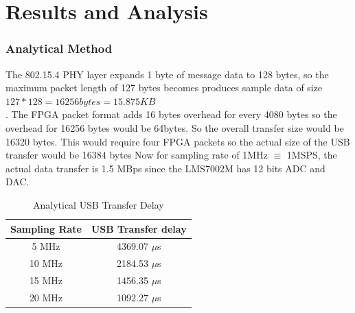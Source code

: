 \documentclass{kththesis}
\begin{document}


\frontmatter



\setcounter{secnumdepth}{2}
\setcounter{tocdepth}{2}
\tableofcontents
\listoffigures
\listoftables

\clearpage

\printacronyms[ heading= chapter*, sort=true]


%
\mainmatter










\chapter{Results and Analysis}
\subsection{Analytical Method}
The 802.15.4 PHY layer expands 1 byte of message data to 128 bytes, so the maximum packet length of 127 bytes becomes produces sample data of size
$127*128=16256 bytes=15.875KB$\\. The FPGA packet format adds 16 bytes overhead for every 4080 bytes so the overhead for 16256 bytes would be 64bytes. So the overall transfer size would be 16320 bytes. This would require four FPGA packets so the actual size of the USB transfer would be 16384 bytes
Now for sampling rate of 1MHz $\equiv$ 1MSPS, the actual data transfer is 1.5 MBps since the LMS7002M has 12 bits ADC and DAC. 
\begin{table}[!h]
\centering
\begin{tabular}{|c|c|}
\hline
Sampling Rate & USB Transfer delay \\
\hline
5 MHz & 4369.07 $\mu$s\\
10 MHz & 2184.53 $\mu$s\\
15 MHz & 1456.35 $\mu$s\\
20 MHz & 1092.27 $\mu$s\\
\hline
\end{tabular}
\caption{Analytical USB Transfer Delay}
\label{back_env}
\end{table}
\end{document}
